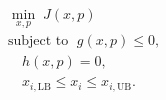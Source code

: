 \[
\begin{aligned}
&\min_{x,p}\; J(x,p)\\
&\text{subject to }\; g(x,p) \le 0,\\
&\quad h(x,p) = 0,\\
&\quad x_{i,\mathrm{LB}} \le x_i \le x_{i,\mathrm{UB}}.
\end{aligned}
\]
